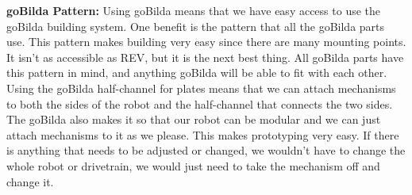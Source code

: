 \par \textbf{goBilda Pattern:} Using goBilda means that we have easy access to use the goBilda building system. One benefit is the pattern that all the goBilda parts use. This pattern makes building very easy since there are many mounting points. It isn't as accessible as REV, but it is the next best thing. All goBilda parts have this pattern in mind, and anything goBilda will be able to fit with each other. Using the goBilda half-channel for plates means that we can attach mechanisms to both the sides of the robot and the half-channel that connects the two sides. The goBilda also makes it so that our robot can be modular and we can just attach mechanisms to it as we please. This makes prototyping very easy. If there is anything that needs to be adjusted or changed, we wouldn't have to change the whole robot or drivetrain, we would just need to take the mechanism off and change it.

\newpage

